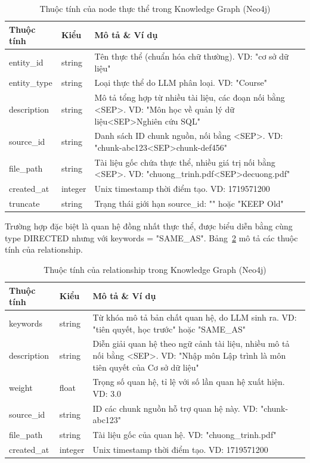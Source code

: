\begin{table}[H]
	\centering
	\renewcommand{\arraystretch}{1.4}
	\caption{Thuộc tính của node thực thể trong Knowledge Graph (Neo4j)}
	\label{tab:kg-node-props}
	\begin{tabular}{|>{\raggedright\arraybackslash}p{3.2cm}|>{\raggedright\arraybackslash}p{1.6cm}|>{\raggedright\arraybackslash}p{8.5cm}|}
		\hline
		Thuộc tính & Kiểu & Mô tả \& Ví dụ \\ \hline
		entity\_id   & string  & Tên thực thể (chuẩn hóa chữ thường). VD: "cơ sở dữ liệu" \\ \hline
		entity\_type & string  & Loại thực thể do LLM phân loại. VD: "Course" \\ \hline
		description  & string  & Mô tả tổng hợp từ nhiều tài liệu, các đoạn nối bằng <SEP>. VD: "Môn học về quản lý dữ liệu<SEP>Nghiên cứu SQL" \\ \hline
		source\_id   & string  & Danh sách ID chunk nguồn, nối bằng <SEP>. VD: "chunk-abc123<SEP>chunk-def456" \\ \hline
		file\_path   & string  & Tài liệu gốc chứa thực thể, nhiều giá trị nối bằng <SEP>. VD: "chuong\_trinh.pdf<SEP>decuong.pdf" \\ \hline
		created\_at  & integer & Unix timestamp thời điểm tạo. VD: 1719571200 \\ \hline
		truncate     & string  & Trạng thái giới hạn source\_id: "" hoặc "KEEP Old" \\ \hline
	\end{tabular}
\end{table}

Trường hợp đặc biệt là quan hệ đồng nhất thực thể, được biểu diễn bằng cùng type DIRECTED nhưng với keywords = "SAME\_AS". Bảng~\ref{tab:kg-edge-props} mô tả các thuộc tính của relationship.

\begin{table}[H]
	\centering
	\renewcommand{\arraystretch}{1.4}
	\caption{Thuộc tính của relationship trong Knowledge Graph (Neo4j)}
	\label{tab:kg-edge-props}
	\begin{tabular}{|>{\raggedright\arraybackslash}p{3.2cm}|>{\raggedright\arraybackslash}p{1.6cm}|>{\raggedright\arraybackslash}p{8.5cm}|}
		\hline
		Thuộc tính & Kiểu & Mô tả \& Ví dụ \\ \hline
		keywords     & string  & Từ khóa mô tả bản chất quan hệ, do LLM sinh ra. VD: "tiên quyết, học trước" hoặc "SAME\_AS" \\ \hline
		description  & string  & Diễn giải quan hệ theo ngữ cảnh tài liệu, nhiều mô tả nối bằng <SEP>. VD: "Nhập môn Lập trình là môn tiên quyết của Cơ sở dữ liệu" \\ \hline
		weight       & float   & Trọng số quan hệ, tỉ lệ với số lần quan hệ xuất hiện. VD: 3.0 \\ \hline
		source\_id   & string  & ID các chunk nguồn hỗ trợ quan hệ này. VD: "chunk-abc123" \\ \hline
		file\_path   & string  & Tài liệu gốc của quan hệ. VD: "chuong\_trinh.pdf" \\ \hline
		created\_at  & integer & Unix timestamp thời điểm tạo. VD: 1719571200 \\ \hline
	\end{tabular}
\end{table}

